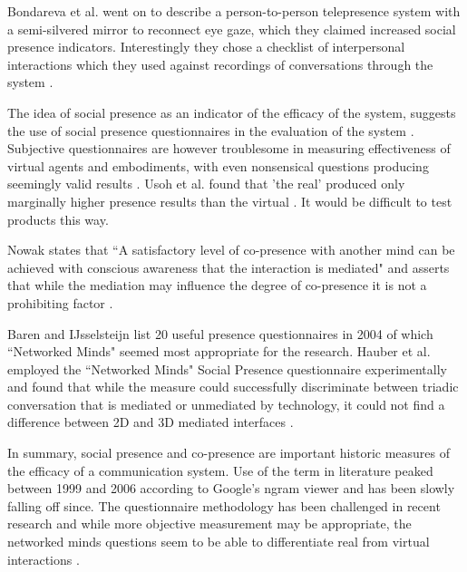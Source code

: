 			     
            Bondareva et al. went on to describe a person-to-person telepresence system with a semi-silvered mirror to reconnect eye gaze, which they claimed increased social presence indicators. Interestingly they chose a checklist of interpersonal interactions which they used against recordings of conversations through the system \cite{Bondareva2004}.  \par
            The idea of social presence as an indicator of the efficacy of the system, suggests the use of social presence questionnaires in the evaluation of the system \cite{Biocca2003}.  Subjective questionnaires are however troublesome in measuring effectiveness of virtual agents and embodiments, with even nonsensical questions producing seemingly valid results \cite{Slater2004}. Usoh et al. found that 'the real' produced only marginally higher presence results than the virtual \cite{Usoh2000}. It would be difficult to test products this way.\par
            Nowak states that ``A satisfactory level of co-presence with another mind can be achieved with conscious awareness that the interaction is mediated" and asserts that while the mediation may influence the degree of co-presence it is not a prohibiting factor \cite{Nowak2001}.\par 
            Baren and IJsselsteijn \cite{Van_Baren2004, Harms2004} list 20 useful presence questionnaires in 2004 of which ``Networked Minds" seemed most appropriate for the research.
            Hauber et al. employed the ``Networked Minds" Social Presence questionnaire experimentally and found that while the measure could successfully discriminate between triadic conversation that is mediated or unmediated by technology, it could not find a difference between 2D and 3D mediated interfaces \cite{Hauber2005, Gunawardena1997}.\par
			In summary, social presence and co-presence are important historic measures of the efficacy of a communication system. Use of the term in literature peaked between 1999 and 2006 according to Google's ngram viewer and has been slowly falling off since. The questionnaire methodology has been challenged in recent research and while more objective measurement may be appropriate, the networked minds questions seem to be able to differentiate real from virtual interactions \cite{Harms2004}.
